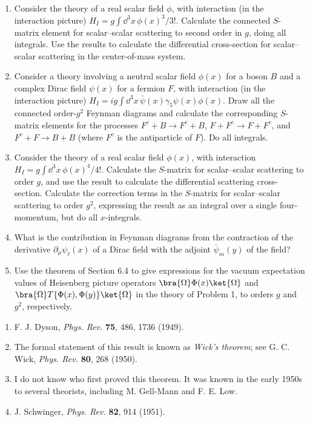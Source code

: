 \begin{enumerate}
\item Consider the theory of a real scalar field $\phi$, with interaction
(in the interaction picture)
$H_I=g\int \dd^3x\,\phi(x)^3/3!$.
Calculate the connected $S$-matrix element for scalar--scalar scattering to
second order in $g$, doing all integrals. Use the results to calculate the
differential cross-section for scalar--scalar scattering in the
center-of-mass system.

\item Consider a theory involving a neutral scalar field $\phi(x)$ for a
boson $B$ and a complex Dirac field $\psi(x)$ for a fermion $F$, with
interaction (in the interaction picture)
$H_I=ig\int \dd^3x\,\bar\psi(x)\gamma_5\psi(x)\phi(x)$.
Draw all the connected order-$g^2$ Feynman diagrams and calculate the
corresponding $S$-matrix elements for the processes
$F^c+B\to F^c+B$, $F+F^c\to F+F^c$, and $F^c+F\to B+B$
(where $F^c$ is the antiparticle of $F$). Do all integrals.

\item Consider the theory of a real scalar field $\phi(x)$, with interaction
$H_I=g\int \dd^3x\,\phi(x)^4/4!$.
Calculate the $S$-matrix for scalar--scalar scattering to order $g$, and use
the result to calculate the differential scattering cross-section. Calculate
the correction terms in the $S$-matrix for scalar--scalar scattering to order
$g^2$, expressing the result as an integral over a single four-momentum, but
do all $x$-integrals.

\item What is the contribution in Feynman diagrams from the contraction of
the derivative $\partial_\mu\psi_\ell(x)$ of a Dirac field with the adjoint
$\bar\psi_m(y)$ of the field?

\item Use the theorem of Section 6.4 to give expressions for the vacuum
expectation values of Heisenberg picture operators
$\bra{\Omega}\Phi(x)\ket{\Omega}$ and
$\bra{\Omega}T\{\Phi(x),\Phi(y)\}\ket{\Omega}$ in the theory of Problem 1,
to orders $g$ and $g^2$, respectively.
\end{enumerate}


\begin{enumerate}
\item\label{ref:6.1} F. J. Dyson, \emph{Phys. Rev.} \textbf{75}, 486, 1736 (1949).

\item\label{ref:6.2} The formal statement of this result is known as \textit{Wick's
theorem}; see G. C. Wick, \emph{Phys. Rev.} \textbf{80}, 268 (1950).

\item\label{ref:6.3} I do not know who first proved this theorem. It was known in the early
1950s to several theorists, including M. Gell-Mann and F. E. Low.

\item\label{ref:6.4} J. Schwinger, \emph{Phys. Rev.} \textbf{82}, 914 (1951).
\end{enumerate}
